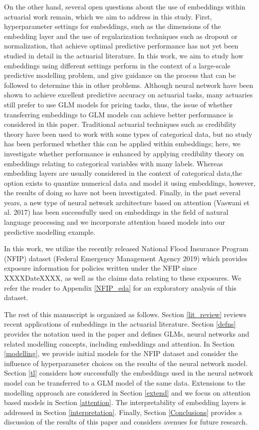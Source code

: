 \documentclass{article}
\begin{document}
On the other hand, several open questions about the use of embeddings
within actuarial work remain, which we aim to address in this study.
First, hyperparameter settings for embeddings, such as the dimensions of
the embedding layer and the use of regularization techniques such as
dropout or normalization, that achieve optimal predictive performance
has not yet been studied in detail in the actuarial literature. In this
work, we aim to study how embeddings using different settings perform in
the context of a large-scale predictive modelling problem, and give
guidance on the process that can be followed to determine this in other
problems. Although neural network have been shown to achieve excellent
predictive accuracy on actuarial tasks, many actuaries still prefer to
use GLM models for pricing tasks, thus, the issue of whether
transferring embeddings to GLM models can achieve better performance is
considered in this paper. Traditional actuarial techniques such as
credibility theory have been used to work with some types of categorical
data, but no study has been performed whether this can be applied within
embeddings; here, we investigate whether performance is enhanced by
applying credibility theory on embeddings relating to categorical
variables with many labels. Whereas embedding layers are usually
considered in the context of categorical data,the option exists to
quantize numerical data and model it using embeddings, however, the
results of doing so have not been investigated. Finally, in the past
several years, a new type of neural network architecture based on
attention (Vaswani et al. 2017) has been successfully used on embeddings
in the field of natural language processing and we incorporate attention
based models into our predictive modelling example.

In this work, we utilize the recently released National Flood Insurance
Program (NFIP) dataset (Federal Emergency Management Agency 2019) which
provides exposure information for policies written under the NFIP since
XXXXDateXXXX, as well as the claims data relating to these exposures. We
refer the reader to Appendix \ref{NFIP_eda} for an exploratory analysis
of this dataset.

The rest of this manuscript is organized as follows. Section
\ref{lit_review} reviews recent applications of embeddings in the
actuarial literature. Section \ref{defns} provides the notation used in
the paper and defines GLMs, neural networks and related modelling
concepts, including embeddings and attention. In Section
\ref{modelling}, we provide initial models for the NFIP dataset and
consider the influence of hyperparameter choices on the results of the
neural network model. Section \ref{tl} considers how successfully the
embeddings used in the neural network model can be transferred to a GLM
model of the same data. Extensions to the modelling approach are
considered in Section \ref{extend} and we focus on attention based
models in Section \ref{attention}. The interpretability of embedding
layers is addressed in Section \ref{interpretation}. Finally, Section
\ref{Conclusions} provides a discussion of the results of this paper and
considers avenues for future research.
\end{document}
